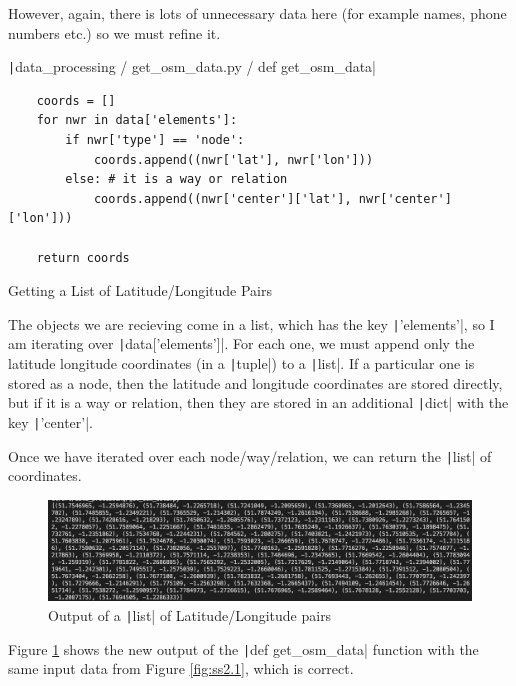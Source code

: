 \documentclass[12pt]{report}
\newcommand{\pil}[1]{\protect\texttt|#1|}
\begin{document}
However, again, there is lots of unnecessary data here (for example names, phone numbers etc.) so we must refine it.

\begin{listing}[H]
\pil{data_processing / get_osm_data.py / def get_osm_data}
\begin{verbatim}
    coords = []
    for nwr in data['elements']:
        if nwr['type'] == 'node':
            coords.append((nwr['lat'], nwr['lon']))
        else: # it is a way or relation
            coords.append((nwr['center']['lat'], nwr['center']['lon']))
    
    return coords
\end{verbatim}
\caption{Getting a List of Latitude/Longitude Pairs}\label{cs:latlongPairs}
\end{listing}
The objects we are recieving come in a list, which has the key \pil{'elements'}, so I am iterating over \pil{data['elements']}. For each one, we must append only the latitude longitude coordinates (in a \pil{tuple}) to a \pil{list}. If a particular one is stored as a node, then the latitude and longitude coordinates are stored directly, but if it is a way or relation, then they are stored in an additional \pil{dict} with the key \pil{'center'}.

Once we have iterated over each node/way/relation, we can return the \pil{list} of coordinates.

\begin{figure}[H]
\centering
\includegraphics[width=14cm]{ss2.2.png}
\caption{Output of a \pil{list} of Latitude/Longitude pairs}\label{fig:ss2.2}
\end{figure}
Figure \ref{fig:ss2.2} shows the new output of the \pil{def get_osm_data} function with the same input data from Figure \ref{fig:ss2.1}, which is correct.

\begin{center}
\end{center}
\end{document}
